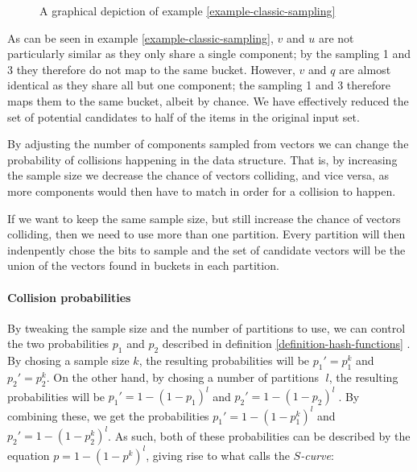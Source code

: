 \begin{figure}[ht]
  \centering

  \caption{A graphical depiction of example \ref{example-classic-sampling}}
  \label{figure-classic-sampling}
\end{figure}

As can be seen in example \ref{example-classic-sampling}, $v$ and $u$ are not particularly similar as they only share a single component; by the sampling 1 and 3 they therefore do not map to the same bucket. However, $v$ and $q$ are almost identical as they share all but one component; the sampling 1 and 3 therefore maps them to the same bucket, albeit by chance. We have effectively reduced the set of potential candidates to half of the items in the original input set.

By adjusting the number of components sampled from vectors we can change the probability of collisions happening in the data structure. That is, by increasing the sample size we decrease the chance of vectors colliding, and vice versa, as more components would then have to match in order for a collision to happen.

If we want to keep the same sample size, but still increase the chance of vectors colliding, then we need to use more than one partition. Every partition will then indenpently chose the bits to sample and the set of candidate vectors will be the union of the vectors found in buckets in each partition.

\paragraph{Collision probabilities} By tweaking the sample size and the number of partitions to use, we can control the two probabilities $p_1$ and $p_2$ described in definition \ref{definition-hash-functions} \cite[p. 101]{DBLP:books/cu/LeskovecRU14}. By chosing a sample size $k$, the resulting probabilities will be $p_1' = p_1^k$ and  $p_2' = p_2^k$. On the other hand, by chosing a number of partitions 􏰄$l$, the resulting probabilities will be $p_1' = 1 - (1 - p_1)^l$ and $p_2' = 1 - (1 - p_2)^l􏰅$. By combining these, we get the probabilities $p_1' = 1 - (1 - p_1^k)^l$ and $p_2' = 1 - (1 - p_2^k)^l$. As such, both of these probabilities can be described by the equation $p = 1 - (1 - p^k)^l$, giving rise to what \cite[p. 89]{DBLP:books/cu/LeskovecRU14} calls the \textit{$S$-curve}:

